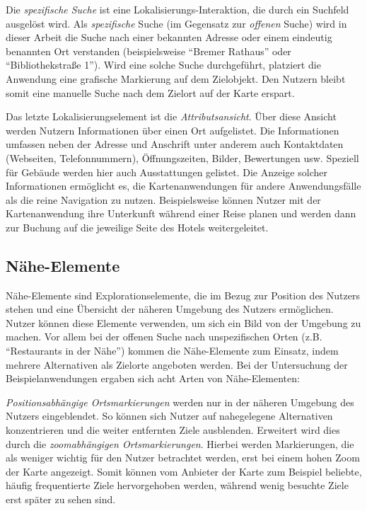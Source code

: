 Die \emph{spezifische Suche} ist eine Lokalisierungs-Interaktion, die durch ein Suchfeld ausgelöst wird.
Als \emph{spezifische} Suche (im Gegensatz zur \emph{offenen} Suche) wird in dieser Arbeit die Suche nach einer bekannten Adresse oder einem eindeutig benannten Ort verstanden (beispielsweise \enquote{Bremer Rathaus} oder \enquote{Bibliothekstraße 1}).
Wird eine solche Suche durchgeführt, platziert die Anwendung eine grafische Markierung auf dem Zielobjekt.
Den Nutzern bleibt somit eine manuelle Suche nach dem Zielort auf der Karte erspart.

Das letzte Lokalisierungselement ist die \emph{Attributsansicht}.
Über diese Ansicht werden Nutzern Informationen über einen Ort aufgelistet.
Die Informationen umfassen neben der Adresse und Anschrift unter anderem auch Kontaktdaten (Webseiten, Telefonnummern), Öffnungszeiten, Bilder, Bewertungen usw.
Speziell für Gebäude werden hier auch Ausstattungen gelistet.
Die Anzeige solcher Informationen ermöglicht es, die Kartenanwendungen für andere Anwendungsfälle als die reine Navigation zu nutzen.
Beispielsweise können Nutzer mit der Kartenanwendung ihre Unterkunft während einer Reise planen und werden dann zur Buchung auf die jeweilige Seite des Hotels weitergeleitet.

\subsection{Nähe-Elemente}
\label{ssec:prox-elements}
Nähe-Elemente sind Explorationselemente, die im Bezug zur Position des Nutzers stehen und eine Übersicht der näheren Umgebung des Nutzers ermöglichen.
Nutzer können diese Elemente verwenden, um sich ein Bild von der Umgebung zu machen.
Vor allem bei der offenen Suche nach unspezifischen Orten (z.B. \enquote{Restaurants in der Nähe}) kommen die Nähe-Elemente zum Einsatz, indem mehrere Alternativen als Zielorte angeboten werden.
Bei der Untersuchung der Beispielanwendungen ergaben sich acht Arten von Nähe-Elementen:

\emph{Positionsabhängige Ortsmarkierungen} werden nur in der näheren Umgebung des Nutzers eingeblendet.
So können sich Nutzer auf nahegelegene Alternativen konzentrieren und die weiter entfernten Ziele ausblenden.
Erweitert wird dies durch die \emph{zoomabhängigen Ortsmarkierungen}.
Hierbei werden Markierungen, die als weniger wichtig für den Nutzer betrachtet werden, erst bei einem hohen Zoom der Karte angezeigt.
Somit können vom Anbieter der Karte zum Beispiel beliebte, häufig frequentierte Ziele hervorgehoben werden, während wenig besuchte Ziele erst später zu sehen sind.

